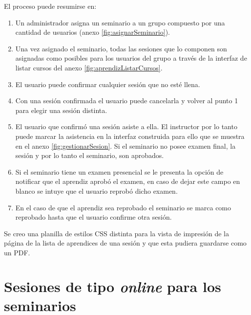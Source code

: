 	El proceso puede resumirse en:

	\begin{enumerate}
		\item Un administrador asigna un seminario a un grupo compuesto por una cantidad de usuarios (anexo \ref{fig:asignarSeminario}). 
		
		\item Una vez asignado el seminario, todas las sesiones que lo componen son asignadas como posibles para los usuarios del grupo a través de la interfaz de listar cursos del anexo \ref{fig:aprendizListarCursos}.

		\item El usuario puede confirmar cualquier sesión que no esté llena.

		\item Con una sesión confirmada el usuario puede cancelarla y volver al punto 1 para elegir una sesión distinta.

		\item El usuario que confirmó una sesión asiste a ella. El instructor por lo tanto puede marcar la asistencia en la interfaz construida para ello que se muestra en el anexo \ref{fig:gestionarSesion}. Si el seminario no posee examen final, la sesión y por lo tanto el seminario, son aprobados.

		\item Si el seminario tiene un examen presencial se le presenta la opción de notificar que el aprendiz aprobó el examen, en caso de dejar este campo en blanco se intuye que el usuario reprobó dicho examen.

		\item En el caso de que el aprendiz sea reprobado el seminario se marca como reprobado hasta que el usuario confirme otra sesión.

	\end{enumerate}

	Se creo una planilla de estilos CSS distinta para la vista de impresión de la página de la lista de aprendices de una sesión y que esta pudiera guardarse como un PDF. 


	\section{Sesiones de tipo \emph{online} para los seminarios} %
	\label{sec:sesiones_de_seminario_tipo_}

